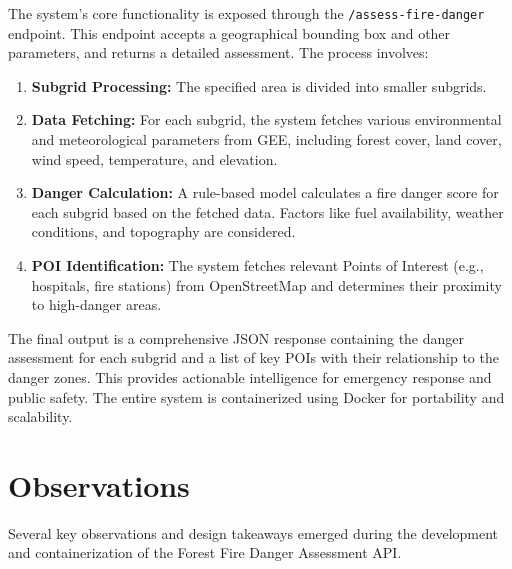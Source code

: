 \documentclass[lang=english,inputenc=utf8,fontsize=10pt]{ldvarticle}
\begin{document}
The system's core functionality is exposed through the \texttt{/assess-fire-danger} endpoint. This endpoint accepts a geographical bounding box and other parameters, and returns a detailed assessment. The process involves:
\begin{enumerate}
    \item \textbf{Subgrid Processing:} The specified area is divided into smaller subgrids.
    \item \textbf{Data Fetching:} For each subgrid, the system fetches various environmental and meteorological parameters from GEE, including forest cover, land cover, wind speed, temperature, and elevation.
    \item \textbf{Danger Calculation:} A rule-based model calculates a fire danger score for each subgrid based on the fetched data. Factors like fuel availability, weather conditions, and topography are considered.
    \item \textbf{POI Identification:} The system fetches relevant Points of Interest (e.g., hospitals, fire stations) from OpenStreetMap and determines their proximity to high-danger areas.
\end{enumerate}
The final output is a comprehensive JSON response containing the danger assessment for each subgrid and a list of key POIs with their relationship to the danger zones. This provides actionable intelligence for emergency response and public safety. The entire system is containerized using Docker for portability and scalability.

\section*{Observations}
Several key observations and design takeaways emerged during the development and containerization of the Forest Fire Danger Assessment API.
\end{document}
